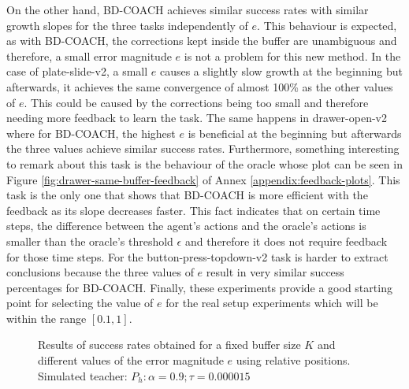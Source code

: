 On the other hand, BD-COACH achieves similar success rates with similar growth slopes for the three tasks independently of $e$. This behaviour is expected, as with BD-COACH, the corrections kept inside the buffer are unambiguous and therefore, a small error magnitude $e$ is not a problem for this new method. In the case of plate-slide-v2, a small $e$ causes a slightly slow growth at the beginning but afterwards, it achieves the same convergence of almost 100\% as the other values of $e$. This could be caused by the corrections being too small and therefore needing more feedback to learn the task. The same happens in drawer-open-v2 where for BD-COACH, the highest $e$ is beneficial at the beginning but afterwards the three values achieve similar success rates. Furthermore, something interesting to remark about this task is the behaviour of the oracle whose plot can be seen in Figure \ref{fig:drawer-same-buffer-feedback} of Annex \ref{appendix:feedback-plots}. This task is the only one that shows that BD-COACH is more efficient with the feedback as its slope decreases faster. This fact indicates that on certain time steps, the difference between the agent's actions and the oracle's actions is smaller than the oracle's threshold $\epsilon$ and therefore it does not require feedback for those time steps.
For the button-press-topdown-v2 task is harder to extract conclusions because the three values of $e$ result in very similar success percentages for BD-COACH. Finally, these experiments provide a good starting point for selecting the value of $e$ for the real setup experiments which will be within the range  $[0.1, 1]$. 




 \begin{figure}[H]
  \centering
   \hfill
  \hfill
  \caption{Results of success rates obtained for a fixed buffer size $K$ and different values of the error magnitude $e$ using relative positions. Simulated teacher: $P_h: \alpha = 0.9; \tau =  0.000015$}
 
  \label{fig:same-buffer}
\end{figure}


